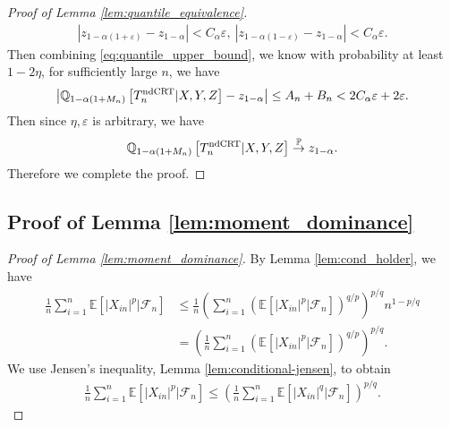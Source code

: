 \documentclass[12pt]{article}
\theoremstyle{definition}
\newcommand{\E}{\mathbb E}								%
\newcommand{\Q}{\mathbb{Q}}								%
\newcommand{\convp}{\overset{\mathbb{P}}{\rightarrow}}             %
\newcommand{\srx}{X}									%
\newcommand{\srz}{Z}									%
\newcommand{\sry}{Y}									%
\newcommand{\ndCRThat}{\textnormal{ndCRT}}	%
\begin{document}
\begin{proof}[Proof of Lemma \ref{lem:quantile_equivalence}]
  \begin{align*}
    |z_{1-\alpha(1+\varepsilon)}-z_{1-\alpha}| < C_\alpha\varepsilon,\ |z_{1-\alpha(1-\varepsilon)}-z_{1-\alpha}|< C_\alpha\varepsilon.
  \end{align*}
  Then combining \eqref{eq:quantile_upper_bound}, we know with probability at least $1-2\eta$, for sufficiently large $n$, we have 
  \begin{align*}
    \left|\Q_{1-\alpha(1+M_n)}\left[T_n^{\ndCRThat}|\srx,\sry,\srz\right] - z_{1-\alpha}\right|\leq A_n+B_n< 2C_\alpha\varepsilon + 2\varepsilon.
  \end{align*}
  Then since $\eta,\varepsilon$ is arbitrary, we have
  \begin{align*}
  \Q_{1-\alpha(1+M_n)}\left[T_n^{\ndCRThat}|\srx,\sry,\srz\right]\convp z_{1-\alpha}.
  \end{align*}
  Therefore we complete the proof.
\end{proof}

\subsection{Proof of Lemma \ref{lem:moment_dominance}}

\begin{proof}[Proof of Lemma \ref{lem:moment_dominance}]
  By Lemma \ref{lem:cond_holder}, we have
  \begin{align*}
    \frac{1}{n}\sum_{i=1}^n \E[|X_{in}|^{p}|\mathcal{F}_n]
    &
    \leq 
    \frac{1}{n}\left(\sum_{i=1}^n \left(\E[|X_{in}|^{p}|\mathcal{F}_n]\right)^{q/p}\right)^{p/q}n^{1-p/q}\\
    &
    =\left(\frac{1}{n}\sum_{i=1}^n \left(\E[|X_{in}|^{p}|\mathcal{F}_n]\right)^{q/p}\right)^{p/q}.
  \end{align*}
  We use Jensen's inequality, Lemma \ref{lem:conditional-jensen}, to obtain
  \begin{align*}
    \frac{1}{n}\sum_{i=1}^n \E[|X_{in}|^{p}|\mathcal{F}_n]\leq \left(\frac{1}{n}\sum_{i=1}^n \E[|X_{in}|^{q}|\mathcal{F}_n]\right)^{p/q}.
  \end{align*}
\end{proof}
\end{document}
